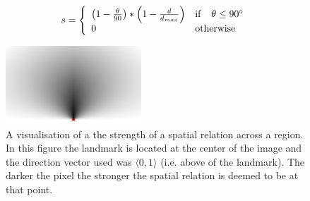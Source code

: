 \begin{equation}
s = \left\{
\begin{array}{l l}
\left(1- \frac{\theta}{90}\right) * \left(1- \frac{d}{d_{max}}\right) & \mathrm{if} \quad \theta \leq 90^{\circ}\\
0 & \mathrm{otherwise}
\end{array} \right.
\label{eq:spatial}
\end{equation}



\begin{figure}
\centerline{
\includegraphics[width=2in]{./images/spatialRelations/xZeroYOne.png}
}
\caption{A visualisation of a the strength of a spatial relation across a region. In this figure the landmark is located at the center of the image and the direction vector used was $\langle0,1\rangle$ (i.e. above of the landmark). The darker the pixel the stronger the spatial relation is deemed to be at that point.}
\label{fig:spr}
\end{figure}

